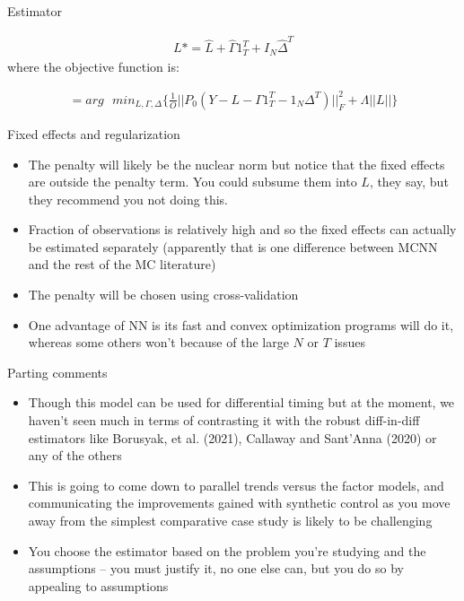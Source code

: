 \documentclass{beamer}
\begin{document}
\begin{frame}{Estimator}

\begin{eqnarray*}
L* = \widehat{L} + \widehat{\Gamma}1_T^T + I_N\widehat{\Delta}^T
\end{eqnarray*}where the objective function is:

\begin{eqnarray*}
= arg\text{ }min_{L,\Gamma,\Delta} \bigg \{ \frac{1}{O} || P_0(Y-L-\Gamma 1_T^T - 1_N\Delta^T)||_F^2 + \Lambda||L|| \bigg \}
\end{eqnarray*}

\end{frame}

\begin{frame}{Fixed effects and regularization}

\begin{itemize}
\item The penalty will likely be the nuclear norm but notice that the fixed effects are outside the penalty term.  You could subsume them into $L$, they say, but they recommend you not doing this.
\item Fraction of observations is relatively high and so the fixed effects can actually be estimated separately (apparently that is one difference between MCNN and the rest of the MC literature)
\item The penalty will be chosen using cross-validation
\item One advantage of NN is its fast and convex optimization programs will do it, whereas some others won't because of the large $N$ or $T$ issues
\end{itemize}

\end{frame}


\begin{frame}{Parting comments}

\begin{itemize}
\item Though this model  can be used for differential timing but at the moment, we haven't seen much in terms of contrasting it with the robust diff-in-diff estimators like Borusyak, et al. (2021), Callaway and Sant'Anna (2020) or any of the others
\item This is going to come down to parallel trends versus the factor models, and communicating the improvements gained with synthetic control as you move away from the simplest comparative case study is likely to be challenging
\item You choose the estimator based on the problem you're studying and the assumptions -- you must justify it, no one else can, but you do so by appealing to assumptions
\end{itemize}

\end{frame}
\end{document}
